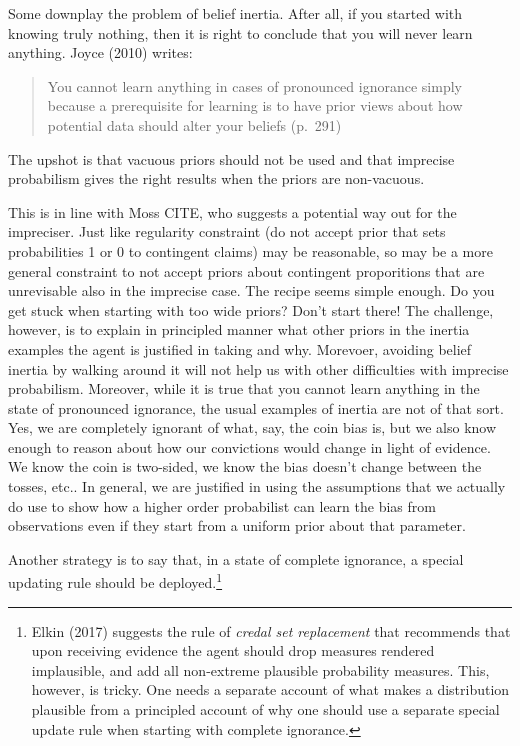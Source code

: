 \documentclass[
  letterpaper,
  DIV=11,
  numbers=noendperiod]{scrartcl}
\begin{document}
Some downplay the problem of belief inertia. After all, if you started
with knowing truly nothing, then it is right to conclude that you will
never learn anything. Joyce (2010) writes:

\begin{quote}
You cannot learn anything in cases of pronounced ignorance simply
because a prerequisite for learning is to have prior views about how
potential data should alter your beliefs (p.~291)
\end{quote}

\noindent The upshot is that vacuous priors should not be used and that
imprecise probabilism gives the right results when the priors are
non-vacuous.


This is in line with Moss CITE, who suggests a potential way out for the
impreciser. Just like regularity constraint (do not accept prior that
sets probabilities 1 or 0 to contingent claims) may be reasonable, so
may be a more general constraint to not accept priors about contingent
proporitions that are unrevisable also in the imprecise case. The recipe
seems simple enough. Do you get stuck when starting with too wide
priors? Don't start there! The challenge, however, is to explain in
principled manner what other priors in the inertia examples the agent is
justified in taking and why. Morevoer, avoiding belief inertia by
walking around it will not help us with other difficulties with
imprecise probabilism. Moreover, while it is true that you cannot learn
anything in the state of pronounced ignorance, the usual examples of
inertia are not of that sort. Yes, we are completely ignorant of what,
say, the coin bias is, but we also know enough to reason about how our
convictions would change in light of evidence. We know the coin is
two-sided, we know the bias doesn't change between the tosses, etc.. In
general, we are justified in using the assumptions that we actually do
use to show how a higher order probabilist can learn the bias from
observations even if they start from a uniform prior about that
parameter.

 Another strategy is to
say that, in a state of complete ignorance, a special updating rule
should be deployed.\footnote{Elkin (2017) suggests the rule of
  \emph{credal set replacement} that recommends that upon receiving
  evidence the agent should drop measures rendered implausible, and add
  all non-extreme plausible probability measures. This, however, is
  tricky. One needs a separate account of what makes a distribution
  plausible from a principled account of why one should use a separate
  special update rule when starting with complete ignorance.}
\end{document}
